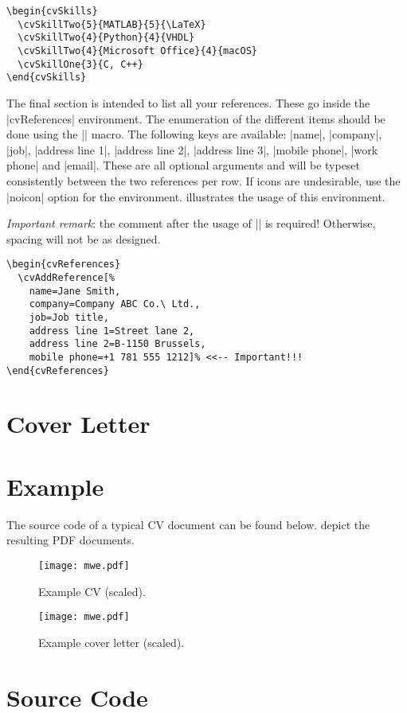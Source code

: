 \documentclass{ltxdoc}
\begin{document}
  \begin{lstlisting}[caption={Illustration of the \lstinline!cvSkills! environment.},label=cvSkills]
\begin{cvSkills}
  \cvSkillTwo{5}{MATLAB}{5}{\LaTeX}
  \cvSkillTwo{4}{Python}{4}{VHDL}
  \cvSkillTwo{4}{Microsoft Office}{4}{macOS}
  \cvSkillOne{3}{C, C++}
\end{cvSkills}
  \end{lstlisting}
  
  The final section is intended to list all your references. These go inside the |cvReferences| environment. The enumeration of the different items should be done using the \DescribeMacro{\cvAddReference} || macro. The following keys are available: |name|, |company|, |job|, |address line 1|, |address line 2|, |address line 3|, |mobile phone|, |work phone| and |email|. These are all optional arguments and will be typeset consistently between the two references per row. If icons are undesirable, use the |noicon| option for the environment.  illustrates the usage of this environment.
  
  \emph{Important remark}: the comment after the usage of |\cvAddReference| is required! Otherwise, spacing will not be as designed.
  
  \begin{lstlisting}[caption={\lstinline!cvReferences! code example.},label=cvReferences]
\begin{cvReferences}
  \cvAddReference[%
    name=Jane Smith,
    company=Company ABC Co.\ Ltd.,
    job=Job title,
    address line 1=Street lane 2,
    address line 2=B-1150 Brussels,
    mobile phone=+1 781 555 1212]% <<-- Important!!!
\end{cvReferences}
  \end{lstlisting}

\section{Cover Letter}

\section{Example}

  The source code of a typical CV document can be found below.  depict the resulting PDF documents.

  \begin{figure}[!ht]
    \texttt{[image: mwe.pdf]}
    \caption{Example CV (scaled).}
    \label{example-cv}
  \end{figure}

  \begin{figure}[!ht]
    \texttt{[image: mwe.pdf]}
    \caption{Example cover letter (scaled).}
    \label{example-cover-letter}
  \end{figure}

  

\section{Source Code}



\PrintIndex
\end{document}
